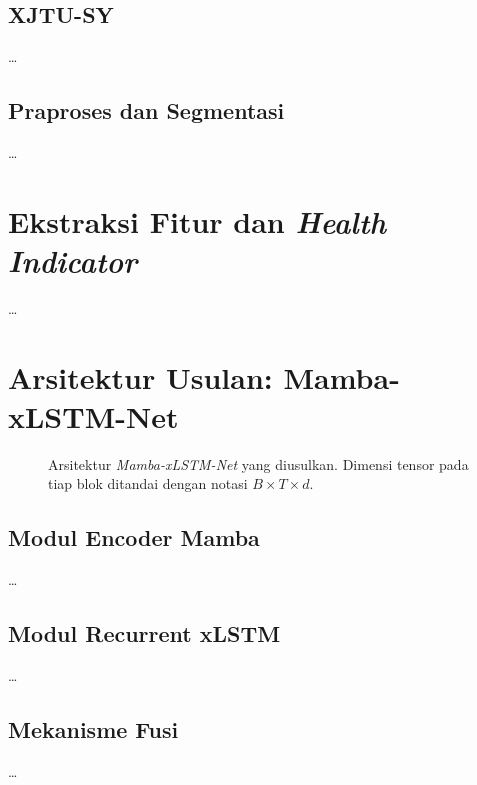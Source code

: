 \subsection{XJTU-SY}
\label{subsec:bab4_xjtusy}
\dots

\subsection{Praproses dan Segmentasi}
\label{subsec:bab4_praproses}
\dots

\section{Ekstraksi Fitur dan \emph{Health Indicator}}
\label{subsec:bab4_hi}

\dots

\section{Arsitektur Usulan: Mamba-xLSTM-Net}
\label{subsec:bab4_arsitektur}

\begin{figure}[ht]
\centering
\caption{Arsitektur \emph{Mamba-xLSTM-Net} yang diusulkan. Dimensi
tensor pada tiap blok ditandai dengan notasi $B \times T \times d$.}
\label{fig:bab4_arsitektur}
\end{figure}

\subsection{Modul Encoder Mamba}
\label{subsec:bab4_mamba}
\dots

\subsection{Modul Recurrent xLSTM}
\label{subsec:bab4_xlstm}
\dots

\subsection{Mekanisme Fusi}
\label{subsec:bab4_fusi}
\dots

